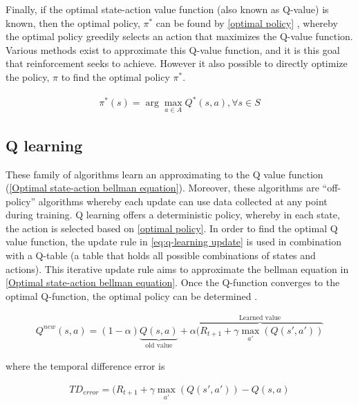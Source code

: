 Finally, if the optimal state-action value function  (also known as Q-value) is known, then the optimal policy, $\pi^*$ can be found by \autoref{optimal policy} \cite{raoOPTIMALPOLICYOPTIMAL}, whereby the optimal policy greedily selects an action that maximizes the Q-value function.
Various methods exist to approximate this Q-value function, and it is this goal that reinforcement seeks to achieve. However it also possible to directly optimize the policy, $\pi$ to find the optimal policy $\pi^*$.

\begin{equation}
	\begin{aligned}
		\pi^*(s) = \arg \max_{a \in A} Q^*(s, a), \forall s \in S
	\end{aligned}
	\label{optimal policy}
\end{equation}

\subsection{Q learning}
These family of algorithms learn an approximating to the Q value function (\autoref{Optimal state-action bellman equation}). Moreover, these algorithms are ``off-policy'' algorithms whereby each update can use data collected at any point during training. Q learning offers a deterministic policy, whereby in each state, the action is selected based on \autoref{optimal policy}. In order to find the optimal Q value function, the update rule in \autoref{eq:q-learning update} is used in combination with a Q-table (a table that holds all possible combinations of states and actions). This iterative update rule aims to approximate the bellman equation in \autoref{Optimal state-action bellman equation}. Once the Q-function converges to the optimal Q-function, the optimal policy can be determined \cite{daveUnderstandingBellmanOptimality2021}.

\begin{equation}
	\begin{aligned}
		Q^{new}(s,a) = (1 -\alpha) \underbrace{Q(s,a)}_{\text{old value}} + \alpha \overbrace{(R_{t+1} + \gamma \max_{a'}(Q(s',a'))}^{\text{Learned value}}
	\end{aligned}
	\label{eq:q-learning update}
\end{equation}

where the temporal difference error is

\begin{equation}
	\begin{aligned}
		TD_{error} = (R_{t+1} + \gamma \max_{a'}(Q(s',a')) - Q(s,a)
	\end{aligned}
	\label{eq:temporal difference}
\end{equation}

